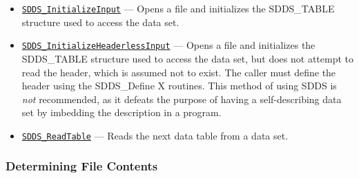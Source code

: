 \documentclass[11pt]{article}
\newcommand{\progref}[1]{\hyperref[SDDS_#1]{\tt SDDS\_#1}}
\begin{document}
\begin{itemize}
\item \progref{InitializeInput} --- Opens a file and initializes the SDDS\_TABLE structure used to access the data set.
\item \progref{InitializeHeaderlessInput} --- Opens a file and initializes the SDDS\_TABLE structure used to access the data set, but does not attempt to read the header, which is assumed not to exist. The caller must define the header using the SDDS\_Define X routines. This method of using SDDS is {\em not} recommended, as it defeats the purpose of having a self-describing data set by imbedding the description in a program.
\item \progref{ReadTable} --- Reads the next data table from a data set. 
\end{itemize}

\subsubsection{Determining File Contents}
\end{document}
